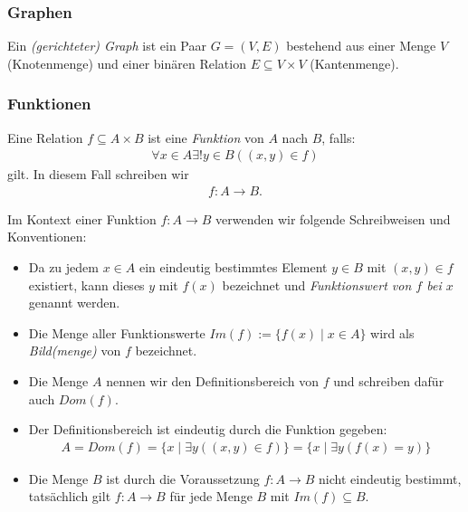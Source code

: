 \subsubsection{Graphen}%
\label{ssub:graphen}
\begin{minipage}{0.9\linewidth}
	Ein \textit{(gerichteter) Graph} ist ein Paar $G=(V,E)$ bestehend aus einer Menge $V$ (Knotenmenge) und einer binären Relation $E\subseteq V\times V$ (Kantenmenge).
\end{minipage}

\subsubsection{Funktionen}%
\label{ssub:funktionen}
\begin{minipage}{0.9\linewidth}
	Eine Relation $f\subseteq A \times B$ ist eine \textit{Funktion} von $A$ nach $B$, falls:
	\begin{align*}
		\forall x\in A\exists!y\in B((x,y)\in f)
	\end{align*}
	gilt. In diesem Fall schreiben wir
	\begin{align*}
		f:A\to B.
	\end{align*}
\end{minipage}

\begin{minipage}{0.9\linewidth}
	Im Kontext einer Funktion $f:A\to B$ verwenden wir folgende Schreibweisen und Konventionen:
	\begin{itemize}
		\item Da zu jedem $x\in A$ ein eindeutig bestimmtes Element $y\in B$ mit $(x,y)\in f$ existiert, kann dieses $y$ mit $f(x)$ bezeichnet und \textit{Funktionswert von $f$ bei $x$} genannt werden.
		\item Die Menge aller Funktionswerte $Im(f) := \{f(x)\mid x\in A \}$ wird als \textit{Bild(menge)} von $f$ bezeichnet.
		\item Die Menge $A$ nennen wir den Definitionsbereich von $f$ und schreiben dafür auch $Dom(f)$.
		\item Der Definitionsbereich ist eindeutig durch die Funktion gegeben:
		      \begin{align*}
			      A=Dom(f)=\{x\mid \exists y ((x,y)\in f) \}=\{x\mid \exists y (f(x)=y )\}
		      \end{align*}
		\item Die Menge $B$ ist durch die Voraussetzung $f:A\to B$ nicht eindeutig bestimmt, tatsächlich gilt $f:A\to B$ für jede Menge $B$ mit $Im(f)\subseteq B$.
	\end{itemize}
\end{minipage}

